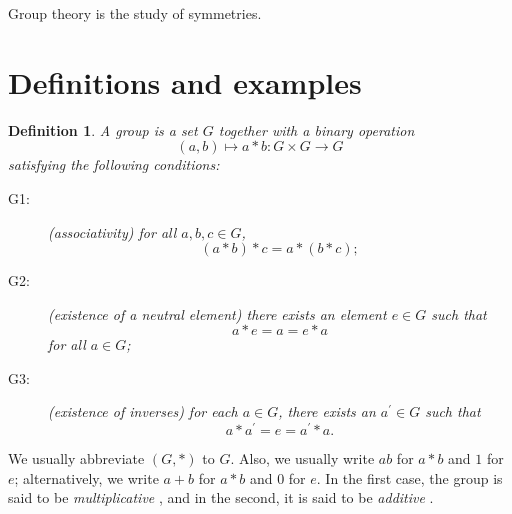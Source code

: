 \documentclass[a4paper,11pt,final,openany]{memoir}%
\newtheorem{definition}[X]{Definition}
\theoremstyle{nonumberplain}
\begin{document}
Group theory is the study of symmetries.

\section{Definitions and examples}

\begin{definition}
\label{bd1} A \emph{group}%
is a set $G$ together with a binary operation
\[
(a,b)\mapsto a\ast b\colon G\times G\rightarrow G
\]
satisfying the following conditions:

\begin{description}
\item[G1:] (associativity) for all $a,b,c\in G$,
\[
(a\ast b)\ast c=a\ast(b\ast c);
\]


\item[G2:] (existence of a neutral element) there exists an element $e\in G$
such that
\begin{equation}
a\ast e=a=e\ast a \label{e14}%
\end{equation}
for all $a\in G$;

\item[G3:] (existence of inverses) for each $a\in G$, there exists an
$a^{\prime}\in G$ such that
\[
a\ast a^{\prime}=e=a^{\prime}\ast a.
\]

\end{description}
\end{definition}

\noindent We usually abbreviate $(G,\ast)$ to $G$. Also, we usually write $ab$
for $a\ast b$ and $1$ for $e$; alternatively, we write $a+b$ for $a\ast b$ and
0 for $e$. In the first case, the group is said to be \emph{multiplicative}%
%
, and in the second, it is said to be \emph{additive}%
%
.
\end{document}
